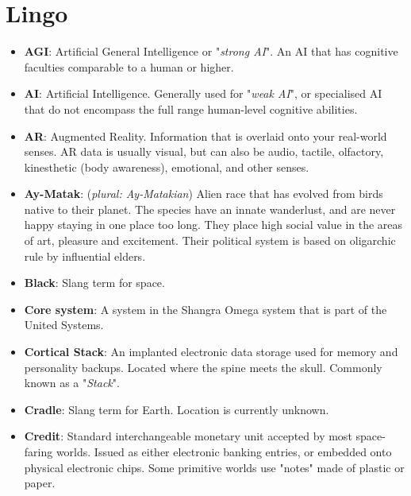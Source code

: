 \documentclass[10pt,twoside]{article}
\begin{document}
  \newpage


  \section{Lingo}

  \begin{multicols}{2}

  \begin{itemize}

    \item \textbf{AGI}: Artificial General Intelligence or "\textit{strong AI}". An AI that has cognitive faculties comparable to a human or higher.

    \item \textbf{AI}: Artificial Intelligence. Generally used for "\textit{weak AI}", or specialised AI that do not encompass the full range human-level cognitive abilities.

    \item \textbf{AR}: Augmented Reality. Information that is overlaid onto your real-world senses. AR data is usually visual, but can also be audio, tactile, olfactory, kinesthetic (body awareness), emotional, and other senses.

    \item \textbf{Ay-Matak}: (\textit{plural: Ay-Matakian}) Alien race that has evolved from birds native to their planet. The species have an innate wanderlust, and are never happy staying in one place too long. They place high social value in the areas of art, pleasure and excitement. Their political system is based on oligarchic rule by influential elders.

    \item \textbf{Black}: Slang term for space.

    \item \textbf{Core system}: A system in the Shangra Omega system that is part of the United Systems.

    \item \textbf{Cortical Stack}: An implanted electronic data storage used for memory and personality backups. Located where the spine meets the skull. Commonly known as a "\textit{Stack}".

    \item \textbf{Cradle}: Slang term for Earth. Location is currently unknown.

    \item \textbf{Credit}: Standard interchangeable monetary unit accepted by most space-faring worlds. Issued as either electronic banking entries, or embedded onto physical electronic chips. Some primitive worlds use "notes" made of plastic or paper.


\end{itemize}
\end{multicols}
\end{document}
